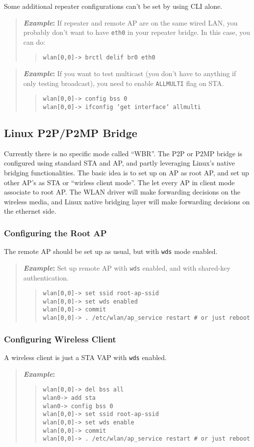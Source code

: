 \documentclass[10pt,fullpage]{article}
\newcommand{\mytt}[1]{{\texttt{#1}}}
\newcommand{\bv}{\begin{verse}}
\newcommand{\ev}{\end{verse}}
\newcommand{\cliparam}[1]{{\texttt{#1}}}
\newcommand{\clidemo}[1]{{\texttt{wlan[0,0]-> #1}}}
\newcommand{\clidemonobss}[1]{{\texttt{wlan0-> #1}}}
\newenvironment{example}{\begin{quote}\textbf{\textit{Example}:}}{\end{quote}}
\begin{document}
Some additional repeater configurations can't be set by using CLI alone. 

\begin{example}
If repeater and remote AP are on the same wired LAN,
you probably don't want to have \mytt{eth0} in your repeater bridge.
In this case, you can do:
  \bv
  \clidemo{brctl delif br0 eth0}
  \ev
\end{example}

\begin{example}
If you want to test multicast (you don't have to anything if only
testing broadcast), you need to enable \mytt{ALLMULTI} flag on STA.
  \bv
  \clidemo{config bss 0}\\
  \clidemo{ifconfig `get interface` allmulti}
  \ev
\end{example}

\subsection{Linux P2P/P2MP Bridge}
Currently there is no specific mode called ``WBR''. The P2P or P2MP bridge
is configured using standard STA and AP, and partly leveraging Linux's
native bridging functionalities. The basic idea is to set up on AP as root
AP, and set up other AP's as STA or ``wirless client mode''. The let every
AP in client mode associate to root AP. The WLAN driver will make forwarding
decisions on the wireless media, and Linux native bridging layer will
make forwarding decisions on the ethernet side.

\subsubsection{Configuring the Root AP}
The remote AP should be set up as usual, but with \cliparam{wds} mode
enabled.
\begin{example}
  Set up remote AP with \cliparam{wds} enabled, and with shared-key
authentication.
  \bv
  \clidemo{set ssid root-ap-ssid}\\
  \clidemo{set wds enabled}\\
  \clidemo{commit}\\
  \clidemo{.  /etc/wlan/ap\_service restart        \# or just reboot}
  \ev
\end{example}

\subsubsection{Configuring Wireless Client}
A wireless client is just a STA VAP with \cliparam{wds} enabled.
\begin{example}
  \bv
  \clidemo{del bss all}\\
  \clidemonobss{add sta}\\
  \clidemonobss{config bss 0}\\
  \clidemo{set ssid root-ap-ssid}\\
  \clidemo{set wds enable}\\
  \clidemo{commit}\\
  \clidemo{.  /etc/wlan/ap\_service restart        \# or just reboot}
  \ev
\end{example}
\end{document}
